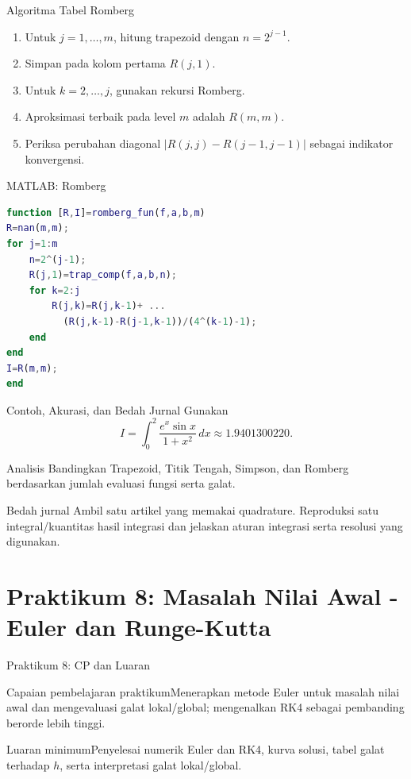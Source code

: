 \documentclass[slides,english,noindex,lean,nobackpage,nocopyright,noupdate,nosummary]{enacom}
\newcommand{\CPBox}[1]{\begin{block}{Capaian pembelajaran praktikum}#1\end{block}}
\newcommand{\OutBox}[1]{\begin{exampleblock}{Luaran minimum}#1\end{exampleblock}}
\begin{document}
\begin{frame}{Algoritma Tabel Romberg}
\begin{enumerate}
\item Untuk $j=1,\ldots,m$, hitung trapezoid dengan $n=2^{j-1}$.
\item Simpan pada kolom pertama $R(j,1)$.
\item Untuk $k=2,\ldots,j$, gunakan rekursi Romberg.
\item Aproksimasi terbaik pada level $m$ adalah $R(m,m)$.
\item Periksa perubahan diagonal $|R(j,j)-R(j-1,j-1)|$ sebagai indikator konvergensi.
\end{enumerate}
\end{frame}

\begin{frame}{MATLAB: Romberg}
\begin{lstlisting}[language=Matlab]
function [R,I]=romberg_fun(f,a,b,m)
R=nan(m,m);
for j=1:m
    n=2^(j-1);
    R(j,1)=trap_comp(f,a,b,n);
    for k=2:j
        R(j,k)=R(j,k-1)+ ...
          (R(j,k-1)-R(j-1,k-1))/(4^(k-1)-1);
    end
end
I=R(m,m);
end
\end{lstlisting}
\end{frame}

\begin{frame}{Contoh, Akurasi, dan Bedah Jurnal}
Gunakan
\[
I=\int_0^2 \frac{e^x\sin x}{1+x^2}\,dx\approx1.9401300220.
\]
\begin{exampleblock}{Analisis}
Bandingkan Trapezoid, Titik Tengah, Simpson, dan Romberg berdasarkan jumlah evaluasi fungsi serta galat.
\end{exampleblock}
\begin{exampleblock}{Bedah jurnal}
Ambil satu artikel yang memakai quadrature. Reproduksi satu integral/kuantitas hasil integrasi dan jelaskan aturan integrasi serta resolusi yang digunakan.
\end{exampleblock}
\end{frame}

\section{Praktikum 8: Masalah Nilai Awal - Euler dan Runge-Kutta}

\begin{frame}{Praktikum 8: CP dan Luaran}
\CPBox{Menerapkan metode Euler untuk masalah nilai awal dan mengevaluasi galat lokal/global; mengenalkan RK4 sebagai pembanding berorde lebih tinggi.}
\OutBox{Penyelesai numerik Euler dan RK4, kurva solusi, tabel galat terhadap $h$, serta interpretasi galat lokal/global.}
\end{frame}
\end{document}
